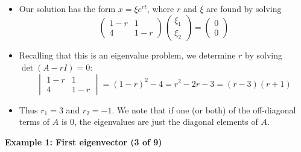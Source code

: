 \documentclass[11pt,a4paper]{article}
\begin{document}
	\begin{itemize}
		\item Our solution has the form $x = \xi e^{rt}$, where $r$ and $\xi$ are found by solving
		$$
		\begin{pmatrix}
			1 - r & 1\\
			4 & 1-r
		\end{pmatrix}
		\begin{pmatrix}
			\xi_1\\
			\xi_2
		\end{pmatrix}
		=
		\begin{pmatrix}
			0\\
			0
		\end{pmatrix}
		$$
		\item Recalling that this is an eigenvalue problem, we determine $r$ by solving $\det(A-rI) = 0$:
		$$
		\begin{vmatrix}
			1 - r & 1\\
			4 & 1-r
		\end{vmatrix}
		= (1-r)^2-4
		= r^2-2r-3
		=(r-3)(r+1)
		$$
		\item Thus $r_1 = 3$ and $r_2 = -1$. We note that if one (or both) of the  off-diagonal terms of $A$ is $0$, the eigenvalues are just the  diagonal elements of $A$.
	\end{itemize}
	\textbf{Example 1: First eigenvector (3 of 9)}
\end{document}
